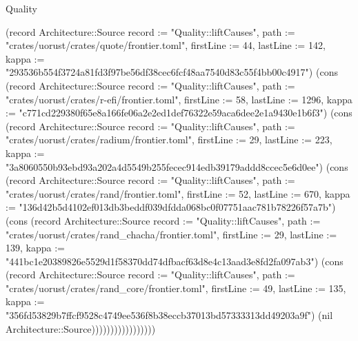 \begin{lexlean}{Quality}
\begin{semanticmodule}
{(record Architecture::Source {record := "Quality::liftCauses", path := "crates/uorust/crates/quote/frontier.toml", firstLine := 44, lastLine := 142, kappa := "293536b554f3724a81fd3f97be56df38cec6fcf48aa7540d83c55f4bb00c4917"}) (cons (record Architecture::Source {record := "Quality::liftCauses", path := "crates/uorust/crates/r-efi/frontier.toml", firstLine := 58, lastLine := 1296, kappa := "c771cd229380f65e8a166fe06a2e2ed1def76322e59aca6dee2e1a9430e1b6f3"}) (cons (record Architecture::Source {record := "Quality::liftCauses", path := "crates/uorust/crates/radium/frontier.toml", firstLine := 29, lastLine := 223, kappa := "3a8060550b93ebd93a202a4d5549b255fecec914edb39179addd8ccec5e6d0ee"}) (cons (record Architecture::Source {record := "Quality::liftCauses", path := "crates/uorust/crates/rand/frontier.toml", firstLine := 52, lastLine := 670, kappa := "136d42b5d4102ef013db3beddf039dfdda068bc0f07751aac781b78226f57a7b"}) (cons (record Architecture::Source {record := "Quality::liftCauses", path := "crates/uorust/crates/rand_chacha/frontier.toml", firstLine := 29, lastLine := 139, kappa := "441bc1e20389826e5529d1f58370dd74dfbacf63d8e4c13aad3e8fd2fa097ab3"}) (cons (record Architecture::Source {record := "Quality::liftCauses", path := "crates/uorust/crates/rand_core/frontier.toml", firstLine := 49, lastLine := 135, kappa := "356fd53829b7ffcf9528c4749ee536f8b38eccb37013bd57333313dd49203a9f"}) (nil Architecture::Source)))))))))))))))))
}


\end{semanticmodule}
\end{lexlean}
